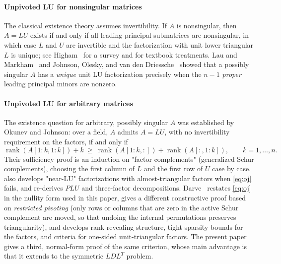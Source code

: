 \documentclass[preprint,12pt]{elsarticle}
\theoremstyle{plain}
\theoremstyle{nonumberplain}
\numberwithin{equation}{section}
\DeclareMathOperator{\rk}{rank}
\numberwithin{theorem}{section}
\begin{document}
\paragraph{Unpivoted LU for nonsingular matrices}
The classical existence theory assumes invertibility.  If $A$ is nonsingular, then $A = LU$ exists if and only if all leading principal submatrices are nonsingular, in which case $L$ and $U$ are invertible and the factorization with unit lower triangular $L$ is unique; see Higham~\cite{higham_gaussian_2011} for a survey and \cite{golub_matrix_2013} for textbook treatments.  Lau and Markham~\cite{lau_markham_1979} and Johnson, Olesky, and van den Driessche~\cite{johnson_inherited_1989} showed that a possibly singular $A$ has a \emph{unique} unit LU factorization precisely when the $n-1$ \emph{proper} leading principal minors are nonzero.

\paragraph{Unpivoted LU for arbitrary matrices}
The existence question for arbitrary, possibly singular $A$ was established by Okunev and Johnson\cite{okunev_johnson_2005,johnson_okunev_2025}: over a field, $A$ admits $A = LU$, with no invertibility requirement on the factors, if and only if
\begin{equation}\label{eq:oj}
  \rk(A[1:k,1:k]) + k \ \ge\ \rk(A[1:k,:]) + \rk(A[:,1:k]),
  \qquad k = 1, \ldots, n .
\end{equation}
Their sufficiency proof is an induction on "factor complements" (generalized Schur complements), choosing the first column of $L$ and the first row of $U$ case by case. \cite{johnson_okunev_2025} also develops "near-LU" factorizations with almost-triangular factors when \cref{eq:oj} fails, and re-derives $PLU$ and three-factor decompositions. Darve~\cite{darve_lu_2026} restates \cref{eq:oj} in the nullity form used in this paper, gives a different constructive proof based on \emph{restricted pivoting} (only rows or columns that are zero in the active Schur complement are moved, so that undoing the internal permutations preserves triangularity), and develops rank-revealing structure, tight sparsity bounds for the factors, and criteria for one-sided unit-triangular factors.  The present paper gives a third, normal-form proof of the same criterion, whose main advantage is that it extends to the symmetric $LDL^T$ problem.
\end{document}
